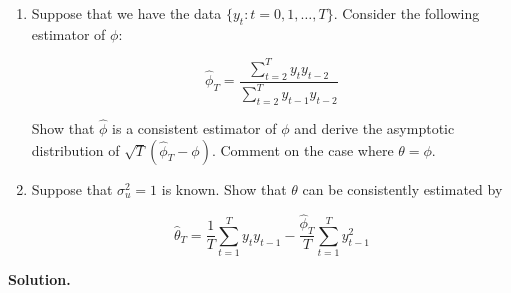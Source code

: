 \begin{enumerate}[(1)]

\item Suppose that we have the data \(\{y_t : t = 0, 1, \ldots, T\} \). Consider the following estimator of \(\phi\):

\[
\hat{\phi}_T = \frac{\sum_{t=2}^T y_t y_{t-2}}{\sum_{t=2}^T y_{t-1} y_{t-2}}
\]

Show that \(\hat{\phi}\) is a consistent estimator of \(\phi\) and derive the asymptotic distribution of \(\sqrt{T}(\hat{\phi}_T - \phi)\). Comment on the case where \(\theta = \phi\).

\item Suppose that \(\sigma_u^2 = 1\) is known. Show that \(\theta\) can be consistently estimated by 

\[
\hat{\theta}_T = \frac{1}{T} \sum_{t=1}^T y_t y_{t-1} - \frac{\hat{\phi}_T}{T}\sum_{t=1}^T y_{t-1}^2
\]

\end{enumerate}

\textbf{Solution.}

